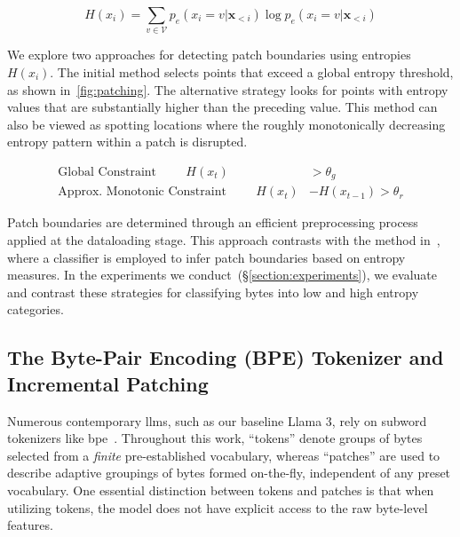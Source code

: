 \begin{equation}
H(x_i) = \sum_{v \in \mathcal{V}} p_{e}(x_i=v|\pmb{x}_{<i}) \log p_{e}(x_i=v|\pmb{x}_{<i})
\end{equation}

We explore two approaches for detecting patch boundaries using entropies $H(x_i)$. The initial method selects points that exceed a global entropy threshold, as shown in~\autoref{fig:patching}. The alternative strategy looks for points with entropy values that are substantially higher than the preceding value. This method can also be viewed as spotting locations where the roughly monotonically decreasing entropy pattern within a patch is disrupted.

\begin{align*}
    \text{Global Constraint}\hspace{1cm}H(x_t)& > \theta_g\\
    \text{Approx. Monotonic Constraint}\hspace{1cm}H(x_t)& - H(x_{t-1}) > \theta_r
\end{align*}

Patch boundaries are determined through an efficient preprocessing process applied at the dataloading stage. This approach contrasts with the method in~\citet{nawrot-etal-2023-efficient}, where a classifier is employed to infer patch boundaries based on entropy measures. In the experiments we conduct~(\S\ref{section:experiments}), we evaluate and contrast these strategies for classifying bytes into low and high entropy categories.

\subsection{The Byte-Pair Encoding (BPE) Tokenizer and Incremental Patching}
\label{section:incremental-patching}
\label{section:bpe-patch}

Numerous contemporary llms, such as our baseline Llama 3, rely on subword tokenizers like bpe~\citep{gage1994new, sennrich-etal-2016-neural}. Throughout this work, ``tokens'' denote groups of bytes selected from a \textit{finite} pre-established vocabulary, whereas ``patches'' are used to describe adaptive groupings of bytes formed on-the-fly, independent of any preset vocabulary. One essential distinction between tokens and patches is that when utilizing tokens, the model does not have explicit access to the raw byte-level features.

